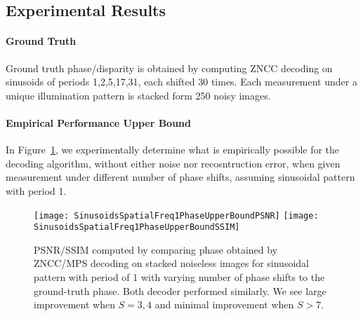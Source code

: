 \documentclass[../writeup.tex]{subfiles}
\begin{document}
\subsection{Experimental Results}

\paragraph{Ground Truth} Ground truth phase/disparity is obtained by computing ZNCC decoding on sinusoids of periods 1,2,5,17,31, each shifted 30 times. Each measurement under a unique illumination pattern is stacked form 250 noisy images. 

\paragraph{Empirical Performance Upper Bound} In Figure~\ref{fig:sinusiods_spatial_freq_1_phase_upper_bound_wrt_S}, we experimentally determine what is empirically possible for the decoding algorithm, without either noise nor recosntruction error, when given measurement under different number of phase shifts, assuming sinusoidal pattern with period 1.
\begin{figure}[h!]
    \begin{center}
        \texttt{[image: SinusoidsSpatialFreq1PhaseUpperBoundPSNR]}
        \texttt{[image: SinusoidsSpatialFreq1PhaseUpperBoundSSIM]}
        \caption{PSNR/SSIM computed by comparing phase obtained by ZNCC/MPS decoding on stacked noiseless images for sinusoidal pattern with period of 1 with varying number of phase shifts to the ground-truth phase. Both decoder performed similarly. We see large improvement when $S=3,4$ and minimal improvement when $S>7$.}
        \label{fig:sinusiods_spatial_freq_1_phase_upper_bound_wrt_S}
    \end{center}
\end{figure}  


\end{document}

